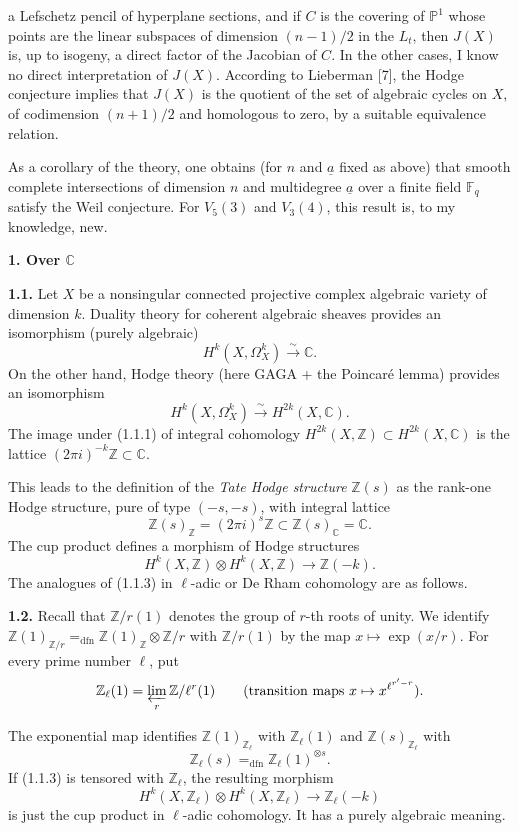 \documentclass[10pt]{article}
\newcommand{\C}{\mathbb C}
\newcommand{\F}{\mathbb F}
\newcommand{\Pj}{\mathbb P}
\newcommand{\Z}{\mathbb Z}
\newcommand{\iso}{\xrightarrow{\sim}}
\newcommand{\dfneq}{\mathrel{=_{\mathrm{dfn}}}}
\newcommand{\sourcebreak}{\clearpage}
\begin{document}
\sourcebreak
a Lefschetz pencil of hyperplane sections, and if \(C\) is the covering of \(\Pj^1\) whose points are the linear subspaces of dimension \((n-1)/2\) in the \(L_t\), then \(J(X)\) is, up to isogeny, a direct factor of the Jacobian of \(C\). In the other cases, I know no direct interpretation of \(J(X)\). According to Lieberman [7], the Hodge conjecture implies that \(J(X)\) is the quotient of the set of algebraic cycles on \(X\), of codimension \((n+1)/2\) and homologous to zero, by a suitable equivalence relation.

As a corollary of the theory, one obtains (for \(n\) and \(\underline a\) fixed as above) that smooth complete intersections of dimension \(n\) and multidegree \(\underline a\) over a finite field \(\F_q\) satisfy the Weil conjecture. For \(V_5(3)\) and \(V_3(4)\), this result is, to my knowledge, new.

\begin{center}\bfseries 1. Over \(\C\)\end{center}

\noindent\textbf{1.1.} Let \(X\) be a nonsingular connected projective complex algebraic variety of dimension \(k\). Duality theory for coherent algebraic sheaves provides an isomorphism (purely algebraic)
\[
\tag{1.1.1}
H^k(X,\Omega_X^k)\iso\C.
\]
On the other hand, Hodge theory (here GAGA + the Poincaré lemma) provides an isomorphism
\[
\tag{1.1.2}
H^k(X,\Omega_X^k)\iso H^{2k}(X,\C).
\]
The image under (1.1.1) of integral cohomology \(H^{2k}(X,\Z)\subset H^{2k}(X,\C)\) is the lattice \((2\pi i)^{-k}\Z\subset\C\).

This leads to the definition of the \emph{Tate Hodge structure} \(\Z(s)\) as the rank-one Hodge structure, pure of type \((-s,-s)\), with integral lattice
\[
\Z(s)_\Z=(2\pi i)^s\Z\subset\Z(s)_\C=\C.
\]
The cup product defines a morphism of Hodge structures
\[
\tag{1.1.3}
H^k(X,\Z)\otimes H^k(X,\Z)\longrightarrow\Z(-k).
\]
The analogues of (1.1.3) in \(\ell\)-adic or De Rham cohomology are as follows.

\noindent\textbf{1.2.} Recall that \(\Z/r(1)\) denotes the group of \(r\)-th roots of unity. We identify \(\Z(1)_{\Z/r}\dfneq\Z(1)_\Z\otimes\Z/r\) with \(\Z/r(1)\) by the map \(x\mapsto\exp(x/r)\). For every prime number \(\ell\), put
\[
\Z_\ell(1)=\varprojlim_r\Z/\ell^r(1)
\qquad\text{(transition maps \(x\mapsto x^{\ell^{r'-r}}\)).}
\]

\sourcebreak
The exponential map identifies \(\Z(1)_{\Z_\ell}\) with \(\Z_\ell(1)\) and \(\Z(s)_{\Z_\ell}\) with
\[
\Z_\ell(s)\dfneq\Z_\ell(1)^{\otimes s}.
\]
If (1.1.3) is tensored with \(\Z_\ell\), the resulting morphism
\[
\tag{1.2.1}
H^k(X,\Z_\ell)\otimes H^k(X,\Z_\ell)\longrightarrow\Z_\ell(-k)
\]
is just the cup product in \(\ell\)-adic cohomology. It has a purely algebraic meaning.
\end{document}
